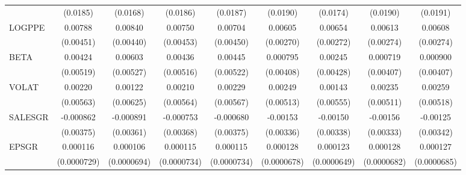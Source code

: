 {\begin{tabular}{l*{8}{c}}
                    &    (0.0185)         &    (0.0168)         &    (0.0186)         &    (0.0187)         &    (0.0190)         &    (0.0174)         &    (0.0190)         &    (0.0191)         \\
LOGPPE              &     0.00788\sym{*}  &     0.00840\sym{*}  &     0.00750         &     0.00704         &     0.00605\sym{**} &     0.00654\sym{**} &     0.00613\sym{**} &     0.00608\sym{**} \\
                    &   (0.00451)         &   (0.00440)         &   (0.00453)         &   (0.00450)         &   (0.00270)         &   (0.00272)         &   (0.00274)         &   (0.00274)         \\
BETA                &     0.00424         &     0.00603         &     0.00436         &     0.00445         &    0.000795         &     0.00245         &    0.000719         &    0.000900         \\
                    &   (0.00519)         &   (0.00527)         &   (0.00516)         &   (0.00522)         &   (0.00408)         &   (0.00428)         &   (0.00407)         &   (0.00407)         \\
VOLAT               &     0.00220         &     0.00122         &     0.00210         &     0.00229         &     0.00249         &     0.00143         &     0.00235         &     0.00259         \\
                    &   (0.00563)         &   (0.00625)         &   (0.00564)         &   (0.00567)         &   (0.00513)         &   (0.00555)         &   (0.00511)         &   (0.00518)         \\
SALESGR             &   -0.000862         &   -0.000891         &   -0.000753         &   -0.000680         &    -0.00153         &    -0.00150         &    -0.00156         &    -0.00125         \\
                    &   (0.00375)         &   (0.00361)         &   (0.00368)         &   (0.00375)         &   (0.00336)         &   (0.00338)         &   (0.00333)         &   (0.00342)         \\
EPSGR               &    0.000116         &    0.000106         &    0.000115         &    0.000115         &    0.000128\sym{*}  &    0.000123\sym{*}  &    0.000128\sym{*}  &    0.000127\sym{*}  \\
                    & (0.0000729)         & (0.0000694)         & (0.0000734)         & (0.0000734)         & (0.0000678)         & (0.0000649)         & (0.0000682)         & (0.0000685)         \\

\end{tabular}}
